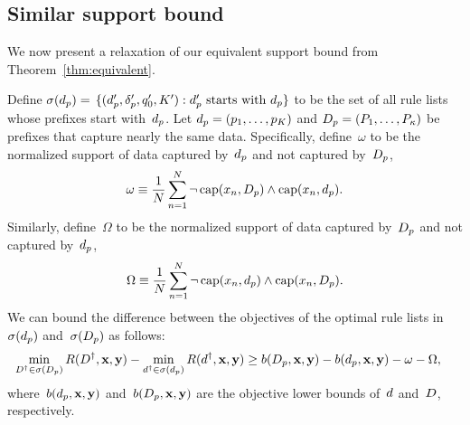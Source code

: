 \begin{arxiv}
\subsection{Similar support bound}
\label{sec:similar}

We now present a relaxation of our equivalent support bound
from Theorem~\ref{thm:equivalent}.

\begin{theorem}
\label{thm:similar}
Define ${\sigma(d_p) = }$
${\{(d_p', \delta_p', q_0', K') : d_p' \textnormal{ starts with } d_p \}}$
to be the set of all rule lists whose prefixes start with~$d_p$.
%
Let ${d_p = (p_1, \dots, p_K)}$ and
${D_p = (P_1, \dots, P_{\kappa})}$ be prefixes
that capture nearly the same data.
%
Specifically, define~$\omega$ to be the normalized support
of data captured by~$d_p$ and not captured by~$D_p$, \ie
\begin{align}
\omega \equiv \frac{1}{N} \sum_{n=1}^N
  \neg\, \Cap(x_n, \PrefixB)
  \wedge \Cap(x_n, \Prefix). %
\label{eq:omega}
\end{align}
%
Similarly, define~$\Omega$ to be the normalized support
of data captured by~$D_p$ and not captured by~$d_p$, \ie
\begin{align}
\Omega \equiv \frac{1}{N} \sum_{n=1}^N
  \neg\, \Cap(x_n, \Prefix)
  \wedge \Cap(x_n, \PrefixB). %
\label{eq:big-omega}
\end{align}
We can bound the difference between the objectives of the
optimal rule lists in~$\sigma(d_p)$
and~$\sigma(D_p)$ as follows:
\begin{align}
\min_{{D}^\dagger \in \sigma(D_p)} R({D}^\dagger, \mathbf{x}, \mathbf{y})
- \min_{{d}^\dagger \in \sigma(d_p)} R({d}^\dagger, \mathbf{x}, \mathbf{y})
&\ge b(D_p, \mathbf{x}, \mathbf{y}) - b(d_p, \mathbf{x}, \mathbf{y}) - \omega - \Omega,
\label{eq:similar}
\end{align}
where~$b(d_p, \mathbf{x}, \mathbf{y})$ and~$b(D_p, \mathbf{x}, \mathbf{y})$ are the
objective lower bounds of~${d}$ and~${D}$, respectively.
\end{theorem}


\end{arxiv}
